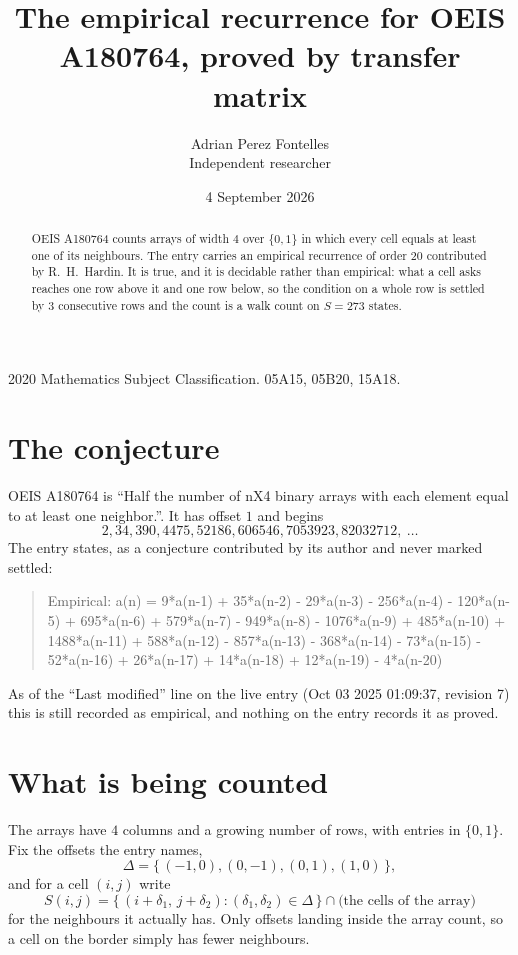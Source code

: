 \documentclass[11pt,a4paper]{article}
\title{The empirical recurrence for OEIS A180764, proved by transfer matrix}
\author{Adrian Perez Fontelles\\ \small Independent researcher}
\date{4 September 2026}
\theoremstyle{plain}
\theoremstyle{definition}
\begin{document}
\maketitle

\begin{abstract}
OEIS A180764 counts arrays of width $4$ over $\{0,1\}$ in which every cell equals at least one of its neighbours. The entry carries an
empirical recurrence of order $20$ contributed by R.~H.~Hardin. It is true, and it is
decidable rather than empirical: what a cell asks reaches one row above it and one row below, so the
condition on a whole row is settled by $3$ consecutive rows and the count is a walk
count on $S=273$ states.
\end{abstract}

\noindent\small 2020 Mathematics Subject Classification. 05A15, 05B20, 15A18.\normalsize

\section{The conjecture}

OEIS A180764 is ``Half the number of nX4 binary arrays with each element equal to at least one neighbor.''. It has offset $1$ and begins
\[
2, 34, 390, 4475, 52186, 606546, 7053923, 82032712,\ \dots
\]
The entry states, as a conjecture contributed by its author and never marked settled:
\begin{quote}
Empirical: a(n) = 9*a(n-1) + 35*a(n-2) - 29*a(n-3) - 256*a(n-4) - 120*a(n-5) + 695*a(n-6) + 579*a(n-7) - 949*a(n-8) - 1076*a(n-9) + 485*a(n-10) + 1488*a(n-11) + 588*a(n-12) - 857*a(n-13) - 368*a(n-14) - 73*a(n-15) - 52*a(n-16) + 26*a(n-17) + 14*a(n-18) + 12*a(n-19) - 4*a(n-20)
\end{quote}
As of the ``Last modified'' line on the live entry (Oct 03 2025 01:09:37, revision 7) this is still
recorded as empirical, and nothing on the entry records it as proved.

\section{What is being counted}

The arrays have $4$ columns and a growing number of rows, with entries in $\{0,1\}$. Fix the
offsets the entry names,
\[
\Delta=\{\,(-1,0), (0,-1), (0,1), (1,0)\,\},
\]
and for a cell $(i,j)$ write
\[
S(i,j)=\{\,(i+\delta_1,\,j+\delta_2) : (\delta_1,\delta_2)\in\Delta\,\}\cap
\text{(the cells of the array)}
\]
for the neighbours it actually has. Only offsets landing inside the array count, so a cell on
the border simply has fewer neighbours.
\end{document}
